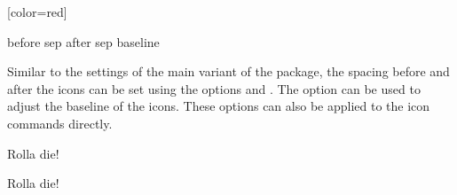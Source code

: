 \documentclass[a4paper]{article}
\begin{document}
\begin{codeexample}

[color=red]
\end{codeexample}

\begin{macrodef}
before sep
after sep
baseline
\end{macrodef}
Similar to the settings of the main variant of the package, the spacing before and after the icons can be set using the options  and . The option  can be used to adjust the baseline of the icons. These options can also be applied to the icon commands directly.

\begin{codeexample}
Rolla die!

Rolla die!
\end{codeexample}

\printchanges
\end{document}
